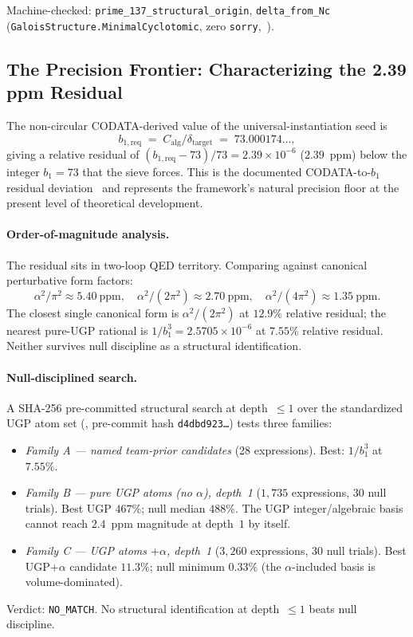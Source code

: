 \documentclass[11pt]{article}
\theoremstyle{remark}
\newcommand{\bone}{b_1}
\newcommand{\bonereq}{b_{1,\mathrm{req}}}
\newcommand{\deltatar}{\delta_{\mathrm{target}}}
\newcommand{\Calg}{C_{\mathrm{alg}}}
\begin{document}
Machine-checked: \texttt{prime\_137\_structural\_origin},
\texttt{delta\_from\_Nc}
(\texttt{Galois\-Structure.\-Minimal\-Cyclo\-tomic}, zero \texttt{sorry},~\cite{ugp-lean}).

\subsection{The Precision Frontier: Characterizing the 2.39 ppm Residual}
\label{subsec:precision_frontier}

The non-circular CODATA-derived value of the universal-instantiation seed is
\[
  \bonereq \;=\; \Calg / \deltatar \;=\; 73.000174\ldots,
\]
giving a relative residual of $(\bonereq - 73)/73 = 2.39\times 10^{-6}$
($2.39$~ppm) below the integer $\bone = 73$ that the sieve forces.
This is the documented CODATA-to-$b_1$ residual deviation~\cite{Spivack2026_SM_UGP} and represents
the framework's natural precision floor at the present level of theoretical
development.

\paragraph{Order-of-magnitude analysis.}
The residual sits in two-loop QED territory.  Comparing against canonical
perturbative form factors:
\[
  \alpha^2/\pi^2 \approx 5.40~\text{ppm}, \quad
  \alpha^2/(2\pi^2) \approx 2.70~\text{ppm}, \quad
  \alpha^2/(4\pi^2) \approx 1.35~\text{ppm}.
\]
The closest single canonical form is $\alpha^2/(2\pi^2)$ at $12.9\%$ relative
residual; the nearest pure-UGP rational is $1/\bone^3 = 2.5705\times 10^{-6}$
at $7.55\%$ relative residual.  Neither survives null discipline as a
structural identification.

\paragraph{Null-disciplined search.}
A SHA-256 pre-committed structural search at depth~$\leq 1$ over the
standardized UGP atom set
(,
pre-commit hash \texttt{d4dbd923\ldots}) tests three families:
\begin{itemize}[leftmargin=2em,itemsep=0.1em]
  \item \emph{Family A --- named team-prior candidates} (28 expressions).
    Best: $1/\bone^3$ at $7.55\%$.
  \item \emph{Family B --- pure UGP atoms (no $\alpha$), depth~1} ($1{,}735$ expressions,
    $30$ null trials).
    Best UGP $467\%$; null median $488\%$.  The UGP integer/algebraic
    basis cannot reach $2.4$~ppm magnitude at depth~$1$ by itself.
  \item \emph{Family C --- UGP atoms $+ \alpha$, depth~1} ($3{,}260$ expressions,
    $30$ null trials).
    Best UGP$+\alpha$ candidate $11.3\%$; null minimum $0.33\%$ (the
    $\alpha$-included basis is volume-dominated).
\end{itemize}
Verdict: \texttt{NO\_MATCH}.  No structural identification at depth~$\leq 1$
beats null discipline.
\end{document}
